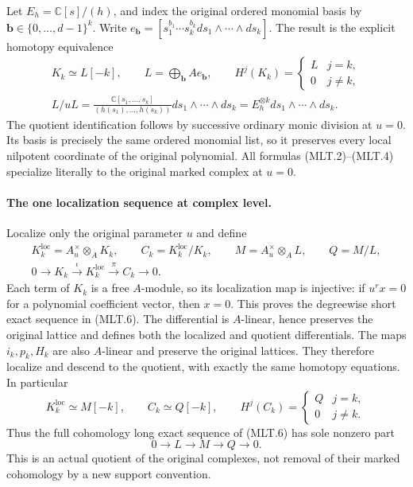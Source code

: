 Let \(E_h=\mathbb C[s]/(h)\), and index the original
ordered monomial basis by \(\mathbf b\in\{0,\ldots,d-1\}^k\).
Write \(e_{\mathbf b}=[s_1^{b_1}\cdots s_k^{b_k}
ds_1\wedge\cdots\wedge ds_k]\). The result is the
explicit homotopy equivalence
\[
 \begin{gathered}
 K_k\simeq L[-k],\qquad
 L=\bigoplus_{\mathbf b}A e_{\mathbf b},\qquad
 H^j(K_k)=
 \begin{cases}L&j=k,\\0&j\ne k,\end{cases}\\
 L/uL=
 \frac{\mathbb C[s_1,\ldots,s_k]}
      {(h(s_1),\ldots,h(s_k))}
       ds_1\wedge\cdots\wedge ds_k
 =E_h^{\otimes k}ds_1\wedge\cdots\wedge ds_k.              \tag{MLT.5}
 \end{gathered}
\]
The quotient identification follows by successive ordinary
monic division at \(u=0\). Its basis is precisely the
same ordered monomial list, so it preserves every local
nilpotent coordinate of the original polynomial.
All formulas (MLT.2)--(MLT.4) specialize literally to
the original marked complex at \(u=0\).

\paragraph{The one localization sequence at complex level.}
Localize only the original parameter \(u\) and define
\[
 \begin{gathered}
 K_k^{\mathrm{loc}}=A^\times_u\otimes_A K_k,\qquad
 C_k=K_k^{\mathrm{loc}}/K_k,\qquad
 M=A^\times_u\otimes_A L,\qquad Q=M/L,\\
 0\longrightarrow K_k\xrightarrow{\iota}K_k^{\mathrm{loc}}
       \xrightarrow{\pi}C_k\longrightarrow0 .
 \end{gathered}                                           \tag{MLT.6}
\]
Each term of \(K_k\) is a free \(A\)-module, so its
localization map is injective: if \(u^r x=0\) for a
polynomial coefficient vector, then \(x=0\). This
proves the degreewise short exact sequence in (MLT.6).
The differential is \(A\)-linear, hence preserves
the original lattice and defines both the localized
and quotient differentials. The maps \(i_k,p_k,H_k\)
are also \(A\)-linear and preserve the original
lattices. They therefore localize and descend to
the quotient, with exactly the same homotopy equations.
In particular
\[
 K_k^{\mathrm{loc}}\simeq M[-k],\qquad
 C_k\simeq Q[-k],\qquad
 H^j(C_k)=
 \begin{cases}Q&j=k,\\0&j\ne k.\end{cases}                 \tag{MLT.7}
\]
Thus the full cohomology long exact sequence of
(MLT.6) has sole nonzero part
\[
                 0\longrightarrow L\longrightarrow M
                    \longrightarrow Q\longrightarrow0. \tag{MLT.8}
\]
This is an actual quotient of the original complexes,
not removal of their marked cohomology by a new
support convention.

